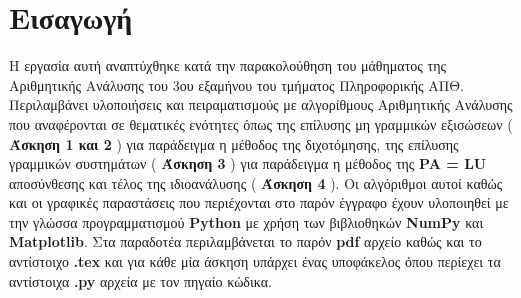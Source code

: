 \documentclass[First Project.tex]{subfiles}
\begin{document}
\section{ Εισαγωγή }

Η εργασία αυτή αναπτύχθηκε κατά την παρακολούθηση του μάθηματος της Αριθμητικής Ανάλυσης του 3ου εξαμήνου 
του τμήματος Πληροφορικής ΑΠΘ. Περιλαμβάνει υλοποιήσεις και πειραματισμούς με αλγορίθμους Αριθμητικής Ανάλυσης που αναφέρονται
σε θεματικές ενότητες όπως της επίλυσης μη γραμμικών εξισώσεων ( \textbf{Άσκηση 1 και 2} ) για παράδειγμα η μέθοδος της 
διχοτόμησης, της επίλυσης γραμμικών συστημάτων ( \textbf{Άσκηση 3} ) για παράδειγμα η μέθοδος της \textbf{
\textlatin{PA = LU}} αποσύνθεσης και τέλος της ιδιοανάλυσης ( \textbf{Άσκηση 4} ). Οι αλγόριθμοι αυτοί καθώς και οι
γραφικές παραστάσεις που περιέχονται στο παρόν έγγραφο έχουν υλοποιηθεί με την γλώσσα προγραμματισμού \textbf{\textlatin{Python}}
με χρήση των βιβλιοθηκών \textbf{\textlatin{NumPy}} και \textbf{\textlatin{Matplotlib}}. Στα παραδοτέα περιλαμβάνεται το παρόν 
\textbf{\textlatin{pdf}} αρχείο καθώς και το αντίστοιχο \textbf{\textlatin{.tex}} και για κάθε μία άσκηση υπάρχει ένας υποφάκελος 
όπου περίεχει τα αντίστοιχα \textbf{\textlatin{.py}} αρχεία με τον πηγαίο κώδικα.
\newpage

    
\end{document}
